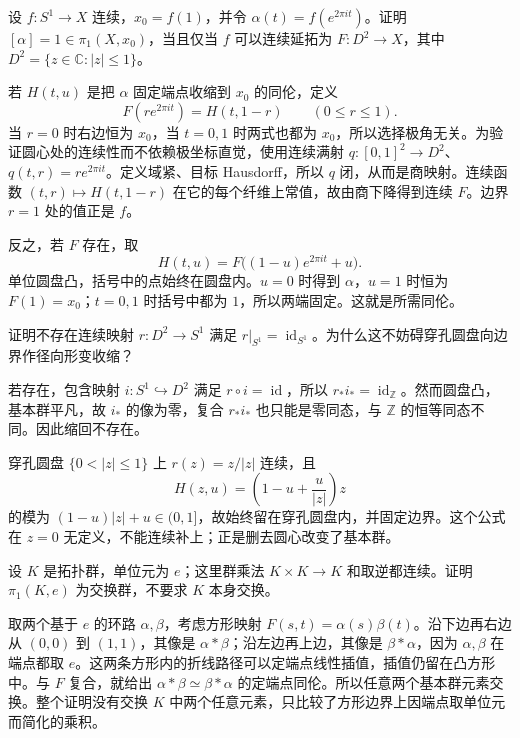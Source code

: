 \begin{exercise}\label{g1:ex:loop-disk-extension}
	设 \(f:S^1\rightarrow X\) 连续，\(x_0=f(1)\)，并令 \(\alpha(t)=f(e^{2\pi it})\)。证明 \([\alpha]=1\in\pi_1(X,x_0)\)，当且仅当 \(f\) 可以连续延拓为 \(F:D^2\rightarrow X\)，其中 \(D^2=\{z\in\mathbb C:|z|\le1\}\)。
\end{exercise}
\begin{solution}
	若 \(H(t,u)\) 是把 \(\alpha\) 固定端点收缩到 \(x_0\) 的同伦，定义
	\[
		F(re^{2\pi it})=H(t,1-r)\qquad(0\le r\le1).
	\]
	当 \(r=0\) 时右边恒为 \(x_0\)，当 \(t=0,1\) 时两式也都为 \(x_0\)，所以选择极角无关。为验证圆心处的连续性而不依赖极坐标直觉，使用连续满射 \(q:[0,1]^2\rightarrow D^2\)、\(q(t,r)=re^{2\pi it}\)。定义域紧、目标 Hausdorff，所以 \(q\) 闭，从而是商映射。连续函数 \((t,r)\mapsto H(t,1-r)\) 在它的每个纤维上常值，故由商下降得到连续 \(F\)。边界 \(r=1\) 处的值正是 \(f\)。

	反之，若 \(F\) 存在，取
	\[
		H(t,u)=F\bigl((1-u)e^{2\pi it}+u\bigr).
	\]
	单位圆盘凸，括号中的点始终在圆盘内。\(u=0\) 时得到 \(\alpha\)，\(u=1\) 时恒为 \(F(1)=x_0\)；\(t=0,1\) 时括号中都为 \(1\)，所以两端固定。这就是所需同伦。
\end{solution}

\begin{exercise}\label{g1:ex:no-disk-boundary-retraction}
	证明不存在连续映射 \(r:D^2\rightarrow S^1\) 满足 \(r|_{S^1}=\operatorname{id}_{S^1}\)。为什么这不妨碍穿孔圆盘向边界作径向形变收缩？
\end{exercise}
\begin{solution}
	若存在，包含映射 \(i:S^1\hookrightarrow D^2\) 满足 \(r\circ i=\operatorname{id}\)，所以 \(r_*i_*=\operatorname{id}_{\mathbb Z}\)。然而圆盘凸，基本群平凡，故 \(i_*\) 的像为零，复合 \(r_*i_*\) 也只能是零同态，与 \(\mathbb Z\) 的恒等同态不同。因此缩回不存在。

	穿孔圆盘 \(\{0<|z|\le1\}\) 上 \(r(z)=z/|z|\) 连续，且
	\[
		H(z,u)=\left(1-u+\frac{u}{|z|}\right)z
	\]
	的模为 \((1-u)|z|+u\in(0,1]\)，故始终留在穿孔圆盘内，并固定边界。这个公式在 \(z=0\) 无定义，不能连续补上；正是删去圆心改变了基本群。
\end{solution}

\begin{exercise}\label{g1:ex:topological-group-pi1-abelian}
	设 \(K\) 是拓扑群，单位元为 \(e\)；这里群乘法 \(K\times K\rightarrow K\) 和取逆都连续。证明 \(\pi_1(K,e)\) 为交换群，不要求 \(K\) 本身交换。
\end{exercise}
\begin{solution}
	取两个基于 \(e\) 的环路 \(\alpha,\beta\)，考虑方形映射 \(F(s,t)=\alpha(s)\beta(t)\)。沿下边再右边从 \((0,0)\) 到 \((1,1)\)，其像是 \(\alpha*\beta\)；沿左边再上边，其像是 \(\beta*\alpha\)，因为 \(\alpha,\beta\) 在端点都取 \(e\)。这两条方形内的折线路径可以定端点线性插值，插值仍留在凸方形中。与 \(F\) 复合，就给出 \(\alpha*\beta\simeq\beta*\alpha\) 的定端点同伦。所以任意两个基本群元素交换。整个证明没有交换 \(K\) 中两个任意元素，只比较了方形边界上因端点取单位元而简化的乘积。
\end{solution}

